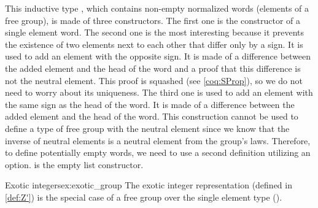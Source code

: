 This inductive type , which contains non-empty normalized words (elements of a free group), is made of three constructors. The first one  is the constructor of a single element word. The second one  is the most interesting because it prevents the existence of two elements next to each other that differ only by a sign. It is used to add an element with the opposite sign. It is made of a difference between the added element and the head of the word and a proof that this difference is not the neutral element. This proof is squashed (see \ref{coq:SProp}), so we do not need to worry about its uniqueness. The third one  is used to add an element with the same sign as the head of the word. It is made of a difference between the added element and the head of the word. This construction cannot be used to define a type of free group with the neutral element since we know that the inverse of neutral elements is a neutral element from the group's laws. Therefore, to define potentially empty words, we need to use a second definition utilizing an option.  is the empty list constructor.

\begin{example}{Exotic integers}{ex:exotic_group}
    The exotic integer representation (defined in \ref{def:Z'}) is the special case of a free group over the single element type ().
\end{example}

